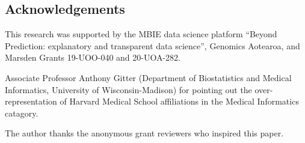 \documentclass[fleqn,10pt,doc,onecolumn]{SelfArx}%
\begin{document}



\subsection*{Acknowledgements}

  This research was supported by the MBIE data
science platform ``Beyond Prediction: explanatory and transparent data
science'', Genomics Aotearoa, and Marsden
Grants 19-UOO-040 and 20-UOA-282.

Associate Professor Anthony Gitter (Department of Biostatistics and
Medical Informatics, University of Wisconsin-Madison) for pointing out
the over-representation of Harvard Medical School affiliations in the
Medical Informatics catagory.

\textcolor{rv2}{The author thanks the anonymous grant
  reviewers who inspired this paper.}




\end{document}
